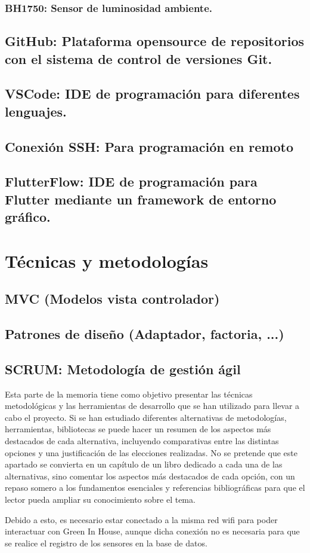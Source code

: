         \subsubsection{BH1750: Sensor de luminosidad ambiente.}  



    \subsection{GitHub: Plataforma opensource de repositorios con el sistema de control de versiones Git.}
    
    \subsection{VSCode: IDE de programación para diferentes lenguajes.}
    
    \subsection{Conexión SSH: Para programación en remoto}
    
    \subsection{FlutterFlow: IDE de programación para Flutter mediante un framework de entorno gráfico.}


\section{Técnicas y metodologías}

    \subsection{MVC (Modelos vista controlador)}
    
    \subsection{Patrones de diseño (Adaptador, factoria, ...)}
    
    \subsection{SCRUM: Metodología de gestión ágil}






Esta parte de la memoria tiene como objetivo presentar las técnicas metodológicas y las herramientas de desarrollo que se han utilizado para llevar a cabo el proyecto. Si se han estudiado diferentes alternativas de metodologías, herramientas, bibliotecas se puede hacer un resumen de los aspectos más destacados de cada alternativa, incluyendo comparativas entre las distintas opciones y una justificación de las elecciones realizadas. 
No se pretende que este apartado se convierta en un capítulo de un libro dedicado a cada una de las alternativas, sino comentar los aspectos más destacados de cada opción, con un repaso somero a los fundamentos esenciales y referencias bibliográficas para que el lector pueda ampliar su conocimiento sobre el tema.


 Debido a esto, es necesario estar conectado a la misma red wifi para poder interactuar con Green In House, aunque dicha conexión no es necesaria para que se realice el registro de los sensores en la base de datos.
